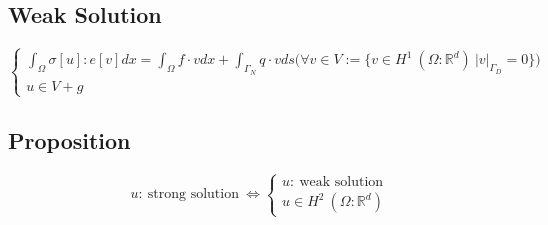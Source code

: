 \documentclass[a4paper,11pt]{article}
\newcommand{\R}{\mathbb{R}}
\begin{document}
\subsection{Weak Solution}
\begin{equation*}
\begin{cases}
\int_\Omega \sigma[u] : e[v] dx = \int_\Omega f\cdot v dx + \int_{\Gamma_N} q\cdot v ds \big( \forall v \in V:= \{ v \in H^1\ (\Omega : \R^d)\ |v|_{\Gamma_D} = 0 \}\big)\\
u \in V+g
\end{cases}
\end{equation*}
\subsection{Proposition}
\begin{equation*}
u:\ \text{strong solution}\ \Leftrightarrow \begin{cases}
u:\ \text{weak solution}\\
u\in H^2\ (\Omega : \R^d)
\end{cases}
\end{equation*}
\end{document}
